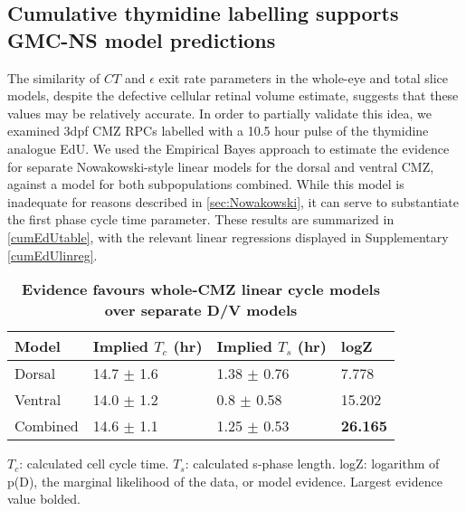\subsection{Cumulative thymidine labelling supports GMC-NS model predictions}

The similarity of $CT$ and $\epsilon$ exit rate parameters in the whole-eye and total slice models, despite the defective cellular retinal volume estimate, suggests that these values may be relatively accurate. In order to partially validate this idea, we examined 3dpf CMZ RPCs labelled with a 10.5 hour pulse of the thymidine analogue EdU. We used the Empirical Bayes approach to estimate the evidence for separate Nowakowski-style \cite{Nowakowski1989} linear models for the dorsal and ventral CMZ, against a model for both subpopulations combined. While this model is inadequate for reasons described in \autoref{sec:Nowakowski}, it can serve to substantiate the first phase cycle time parameter. These results are summarized in \autoref{cumEdUtable}, with the relevant linear regressions displayed in Supplementary \autoref{cumEdUlinreg}.

\begin{table}[!ht]
    \centering
    \caption{{\bf Evidence favours whole-CMZ linear cycle models over separate D/V models}}
    \begin{tabular}{|l|l|l|l|} 
        \hline {\bf Model} & {\bf Implied $T_c$ (hr)} & {\bf Implied $T_s$ (hr)} & {\bf logZ}\\ \hline 
        Dorsal & 14.7 $\pm$ 1.6 & 1.38 $\pm$ 0.76 & 7.778\\ \hline 
        Ventral & 14.0 $\pm$ 1.2 & 0.8 $\pm$ 0.58 & 15.202\\ \hline
        Combined & 14.6 $\pm$ 1.1 & 1.25 $\pm$ 0.53 & {\bf26.165}\\ \hline
    \end{tabular}
   
    \begin{flushleft} $T_c$: calculated cell cycle time. $T_s$: calculated s-phase length. logZ: logarithm of p(D), the marginal likelihood of the data, or model evidence.  Largest evidence value bolded.
    \end{flushleft}
    \label{cumEdUtable}
\end{table}

